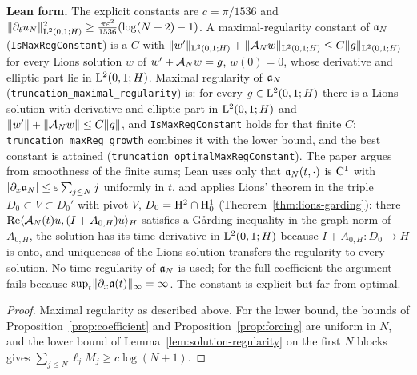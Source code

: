 \textbf{Lean form.}  The explicit constants are $c=\pi/1536$ and
$\lVert \partial_tu_N\rVert^2_{\mathrm{L}^2(0,1;H)}\geq\frac{\pi\varepsilon^2}{1536}(\log(N+2)-1)$.  A
maximal-regularity constant of $\mathfrak{a}_N$ (\texttt{IsMaxRegConstant}) is a $C$ with
$\lVert w'\rVert_{\mathrm{L}^2(0,1;H)}+\lVert \mathcal{A}_N w\rVert_{\mathrm{L}^2(0,1;H)}\leq C\lVert g\rVert_{\mathrm{L}^2(0,1;H)}$ for every
Lions solution $w$ of $w'+\mathcal{A}_Nw=g$, $w(0)=0$, whose derivative and elliptic part lie in
$\mathrm{L}^2(0,1;H)$.  Maximal regularity of $\mathfrak{a}_N$ (\texttt{truncation\_maximal\_regularity}) is:
for every $g\in\mathrm{L}^2(0,1;H)$ there is a Lions solution with derivative and elliptic part in
$\mathrm{L}^2(0,1;H)$ and $\lVert w'\rVert+\lVert \mathcal{A}_Nw\rVert\leq C\lVert g\rVert$, and \texttt{IsMaxRegConstant} holds
for that finite $C$; \texttt{truncation\_maxReg\_growth} combines it with the lower bound, and the
best constant is attained (\texttt{truncation\_optimalMaxRegConstant}).  The paper argues from
smoothness of the finite sums; Lean uses only that $\mathfrak{a}_N(t,\cdot)$ is $\mathrm{C}^1$ with
$\lvert \partial_x\mathfrak{a}_N\rvert\leq\varepsilon\sum_{j\leq N}j$ uniformly in $t$, and applies Lions' theorem in the
triple $D_0\subset V\subset D_0'$ with pivot $V$, $D_0=\mathrm{H}^2\cap\mathrm{H}^1_0$
(Theorem~\ref{thm:lions-garding}): there $\operatorname{Re}\langle\mathcal{A}_N(t)u,(I+A_{0,H})u\rangle_H$ satisfies a
Gårding inequality in the graph norm of $A_{0,H}$, the solution has its time derivative in
$\mathrm{L}^2(0,1;H)$ because $I+A_{0,H}:D_0\to H$ is onto, and uniqueness of the Lions solution transfers
the regularity to every solution.  No time regularity of $\mathfrak{a}_N$ is used; for the full
coefficient the argument fails because $\sup_t\lVert \partial_x\mathfrak{a}(t)\rVert_\infty=\infty$.  The constant
is explicit but far from optimal.

\begin{proof}
  \leanok
  Maximal regularity as described above.  For the lower bound, the bounds of
  Proposition~\ref{prop:coefficient} and Proposition~\ref{prop:forcing} are uniform in $N$, and
  the lower bound of Lemma~\ref{lem:solution-regularity} on the first $N$ blocks gives
  $\sum_{j\leq N}\ell_jM_j\geq c\log(N+1)$.
\end{proof}
